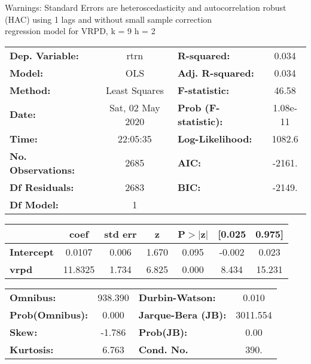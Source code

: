 Warnings: \newline
 [1] Standard Errors are heteroscedasticity and autocorrelation robust (HAC) using 1 lags and without small sample correction\\ 

regression model for VRPD, k = 9 h = 2\begin{center}
\begin{tabular}{lclc}
\toprule
\textbf{Dep. Variable:}    &       rtrn       & \textbf{  R-squared:         } &     0.034   \\
\textbf{Model:}            &       OLS        & \textbf{  Adj. R-squared:    } &     0.034   \\
\textbf{Method:}           &  Least Squares   & \textbf{  F-statistic:       } &     46.58   \\
\textbf{Date:}             & Sat, 02 May 2020 & \textbf{  Prob (F-statistic):} &  1.08e-11   \\
\textbf{Time:}             &     22:05:35     & \textbf{  Log-Likelihood:    } &    1082.6   \\
\textbf{No. Observations:} &        2685      & \textbf{  AIC:               } &    -2161.   \\
\textbf{Df Residuals:}     &        2683      & \textbf{  BIC:               } &    -2149.   \\
\textbf{Df Model:}         &           1      & \textbf{                     } &             \\
\bottomrule
\end{tabular}
\begin{tabular}{lcccccc}
                   & \textbf{coef} & \textbf{std err} & \textbf{z} & \textbf{P$> |$z$|$} & \textbf{[0.025} & \textbf{0.975]}  \\
\midrule
\textbf{Intercept} &       0.0107  &        0.006     &     1.670  &         0.095        &       -0.002    &        0.023     \\
\textbf{vrpd}      &      11.8325  &        1.734     &     6.825  &         0.000        &        8.434    &       15.231     \\
\bottomrule
\end{tabular}
\begin{tabular}{lclc}
\textbf{Omnibus:}       & 938.390 & \textbf{  Durbin-Watson:     } &    0.010  \\
\textbf{Prob(Omnibus):} &   0.000 & \textbf{  Jarque-Bera (JB):  } & 3011.554  \\
\textbf{Skew:}          &  -1.786 & \textbf{  Prob(JB):          } &     0.00  \\
\textbf{Kurtosis:}      &   6.763 & \textbf{  Cond. No.          } &     390.  \\
\bottomrule
\end{tabular}
\end{center}

